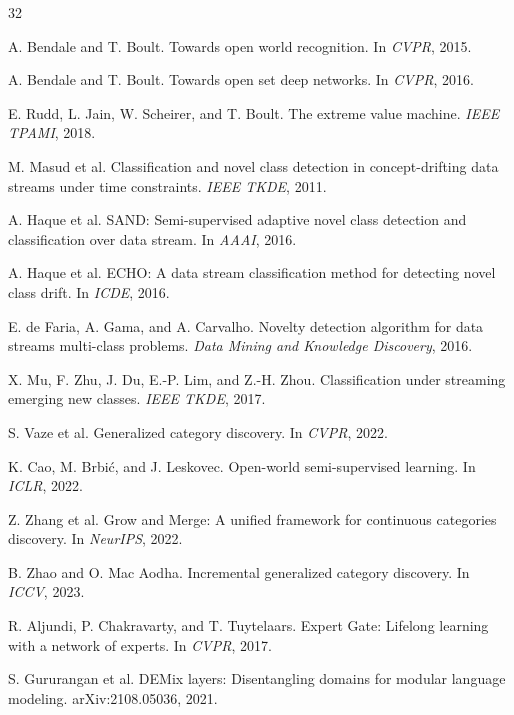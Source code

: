 \documentclass[12pt,oneside]{report}
\begin{document}
\begin{thebibliography}{32}

A. Bendale and T. Boult.
\newblock Towards open world recognition.
\newblock In \emph{CVPR}, 2015.

A. Bendale and T. Boult.
\newblock Towards open set deep networks.
\newblock In \emph{CVPR}, 2016.

E. Rudd, L. Jain, W. Scheirer, and T. Boult.
\newblock The extreme value machine.
\newblock \emph{IEEE TPAMI}, 2018.

M. Masud et al.
\newblock Classification and novel class detection in concept-drifting data
streams under time constraints.
\newblock \emph{IEEE TKDE}, 2011.

A. Haque et al.
\newblock SAND: Semi-supervised adaptive novel class detection and
classification over data stream.
\newblock In \emph{AAAI}, 2016.

A. Haque et al.
\newblock ECHO: A data stream classification method for detecting novel class
drift.
\newblock In \emph{ICDE}, 2016.

E. de Faria, A. Gama, and A. Carvalho.
\newblock Novelty detection algorithm for data streams multi-class problems.
\newblock \emph{Data Mining and Knowledge Discovery}, 2016.

X. Mu, F. Zhu, J. Du, E.-P. Lim, and Z.-H. Zhou.
\newblock Classification under streaming emerging new classes.
\newblock \emph{IEEE TKDE}, 2017.

S. Vaze et al.
\newblock Generalized category discovery.
\newblock In \emph{CVPR}, 2022.

K. Cao, M. Brbi\'c, and J. Leskovec.
\newblock Open-world semi-supervised learning.
\newblock In \emph{ICLR}, 2022.

Z. Zhang et al.
\newblock Grow and Merge: A unified framework for continuous categories
discovery.
\newblock In \emph{NeurIPS}, 2022.

B. Zhao and O. Mac Aodha.
\newblock Incremental generalized category discovery.
\newblock In \emph{ICCV}, 2023.

R. Aljundi, P. Chakravarty, and T. Tuytelaars.
\newblock Expert Gate: Lifelong learning with a network of experts.
\newblock In \emph{CVPR}, 2017.

S. Gururangan et al.
\newblock DEMix layers: Disentangling domains for modular language modeling.
\newblock arXiv:2108.05036, 2021.


\end{thebibliography}
\end{document}
